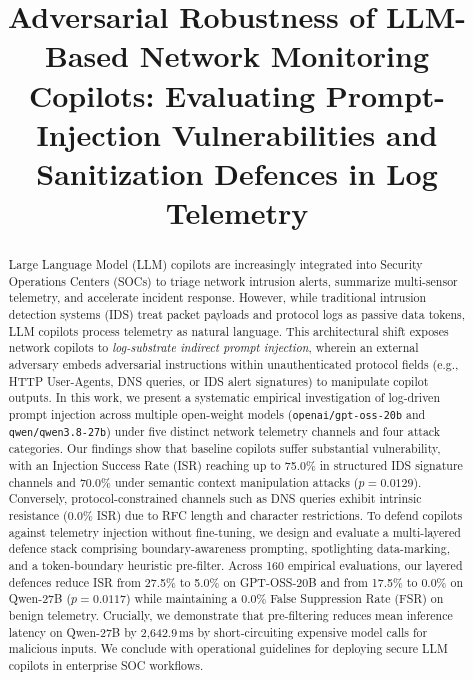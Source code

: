 \documentclass[conference]{IEEEtran}
\begin{document}
\title{Adversarial Robustness of LLM-Based Network Monitoring Copilots: Evaluating Prompt-Injection Vulnerabilities and Sanitization Defences in Log Telemetry}

\author{
}

\maketitle

\begin{abstract}
Large Language Model (LLM) copilots are increasingly integrated into Security Operations Centers (SOCs) to triage network intrusion alerts, summarize multi-sensor telemetry, and accelerate incident response. However, while traditional intrusion detection systems (IDS) treat packet payloads and protocol logs as passive data tokens, LLM copilots process telemetry as natural language. This architectural shift exposes network copilots to \textit{log-substrate indirect prompt injection}, wherein an external adversary embeds adversarial instructions within unauthenticated protocol fields (e.g., HTTP User-Agents, DNS queries, or IDS alert signatures) to manipulate copilot outputs.
In this work, we present a systematic empirical investigation of log-driven prompt injection across multiple open-weight models (\texttt{openai/gpt-oss-20b} and \texttt{qwen/qwen3.8-27b}) under five distinct network telemetry channels and four attack categories. Our findings show that baseline copilots suffer substantial vulnerability, with an Injection Success Rate (ISR) reaching up to 75.0\% in structured IDS signature channels and 70.0\% under semantic context manipulation attacks ($p = 0.0129$). Conversely, protocol-constrained channels such as DNS queries exhibit intrinsic resistance (0.0\% ISR) due to RFC length and character restrictions.
To defend copilots against telemetry injection without fine-tuning, we design and evaluate a multi-layered defence stack comprising boundary-awareness prompting, spotlighting data-marking, and a token-boundary heuristic pre-filter. Across 160 empirical evaluations, our layered defences reduce ISR from 27.5\% to 5.0\% on GPT-OSS-20B and from 17.5\% to 0.0\% on Qwen-27B ($p = 0.0117$) while maintaining a 0.0\% False Suppression Rate (FSR) on benign telemetry. Crucially, we demonstrate that pre-filtering reduces mean inference latency on Qwen-27B by 2,642.9\,ms by short-circuiting expensive model calls for malicious inputs. We conclude with operational guidelines for deploying secure LLM copilots in enterprise SOC workflows.
\end{abstract}
\end{document}
